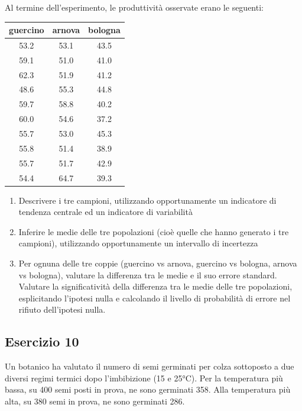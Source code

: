 \documentclass[a4paper,12pt,oneside]{book}
\providecommand{\tightlist}{%
  \setlength{\itemsep}{0pt}\setlength{\parskip}{0pt}}
\begin{document}
Al termine dell'esperimento, le produttività osservate erano le seguenti:

\begin{tabular}{c|c|c}
\hline
guercino & arnova & bologna\\
\hline
53.2 & 53.1 & 43.5\\
\hline
59.1 & 51.0 & 41.0\\
\hline
62.3 & 51.9 & 41.2\\
\hline
48.6 & 55.3 & 44.8\\
\hline
59.7 & 58.8 & 40.2\\
\hline
60.0 & 54.6 & 37.2\\
\hline
55.7 & 53.0 & 45.3\\
\hline
55.8 & 51.4 & 38.9\\
\hline
55.7 & 51.7 & 42.9\\
\hline
54.4 & 64.7 & 39.3\\
\hline
\end{tabular}

\begin{enumerate}
\def\labelenumi{\arabic{enumi}.}
\tightlist
\item
  Descrivere i tre campioni, utilizzando opportunamente un indicatore di tendenza centrale ed un indicatore di variabilità
\item
  Inferire le medie delle tre popolazioni (cioè quelle che hanno generato i tre campioni), utilizzando opportunamente un intervallo di incertezza
\item
  Per ognuna delle tre coppie (guercino vs arnova, guercino vs bologna, arnova vs bologna), valutare la differenza tra le medie e il suo errore standard. Valutare la significatività della differenza tra le medie delle tre popolazioni, esplicitando l'ipotesi nulla e calcolando il livello di probabilità di errore nel rifiuto dell'ipotesi nulla.
\end{enumerate}

\hypertarget{esercizio-10}{%
\subsection{Esercizio 10}\label{esercizio-10}}

Un botanico ha valutato il numero di semi germinati per colza sottoposto a due diversi regimi termici dopo l'imbibizione (15 e 25°C). Per la temperatura più bassa, su 400 semi posti in prova, ne sono germinati 358. Alla temperatura più alta, su 380 semi in prova, ne sono germinati 286.
\end{document}
